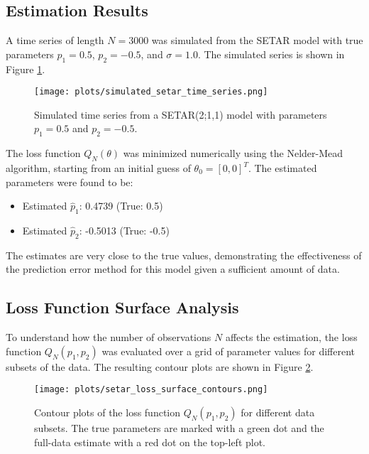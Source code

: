 \documentclass[11pt, a4paper]{article}
\begin{document}
\subsection{Estimation Results}
A time series of length $N=3000$ was simulated from the SETAR model with true parameters $p_1 = 0.5$, $p_2 = -0.5$, and $\sigma=1.0$. The simulated series is shown in Figure \ref{fig:setar_sim}.

\begin{figure}[H]
    \centering
    \texttt{[image: plots/simulated\_setar\_time\_series.png]}
    \caption{Simulated time series from a SETAR(2;1,1) model with parameters $p_1=0.5$ and $p_2=-0.5$.}
    \label{fig:setar_sim}
\end{figure}

The loss function $Q_N(\theta)$ was minimized numerically using the Nelder-Mead algorithm, starting from an initial guess of $\theta_0 = [0, 0]^T$. The estimated parameters were found to be:
\begin{itemize}
    \item Estimated $\hat{p}_1$: 0.4739 (True: 0.5)
    \item Estimated $\hat{p}_2$: -0.5013 (True: -0.5)
\end{itemize}
The estimates are very close to the true values, demonstrating the effectiveness of the prediction error method for this model given a sufficient amount of data.

\subsection{Loss Function Surface Analysis}
To understand how the number of observations $N$ affects the estimation, the loss function $Q_N(p_1, p_2)$ was evaluated over a grid of parameter values for different subsets of the data. The resulting contour plots are shown in Figure \ref{fig:loss_contours}.

\begin{figure}[H]
    \centering
    \texttt{[image: plots/setar\_loss\_surface\_contours.png]}
    \caption{Contour plots of the loss function $Q_N(p_1, p_2)$ for different data subsets. The true parameters are marked with a green dot and the full-data estimate with a red dot on the top-left plot.}
    \label{fig:loss_contours}
\end{figure}
\end{document}
